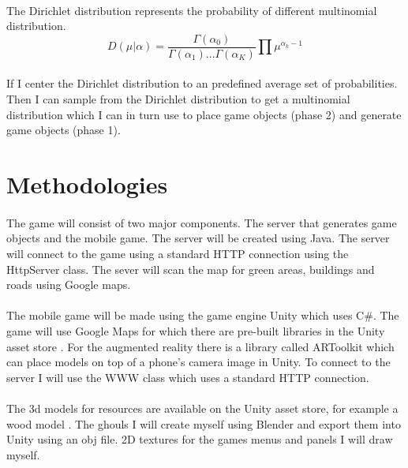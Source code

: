 \documentclass{article}
\begin{document}
		\paragraph{}The Dirichlet distribution represents the probability of different multinomial distribution.
		\begin{equation}
			D(\mu|\alpha ) = \frac{\Gamma(\alpha_0)}{\Gamma(\alpha_1)...\Gamma(\alpha_K)}\prod\mu^{\alpha_k-1}
		\end{equation}
		\paragraph{}If I center the Dirichlet distribution to an predefined average set of probabilities. Then I can sample from the Dirichlet distribution to get a multinomial distribution which I can in turn use to place game objects (phase 2) and generate game objects (phase 1). \cite{Dirichlet2010}
		
		\section{Methodologies}
		\paragraph{}The game will consist of two major components. The server that generates game objects and the mobile game. The server will be created using Java. The server will connect to the game using a standard HTTP connection using the HttpServer class. \cite{HTTPServer} The sever will scan the map for green areas, buildings and roads using Google maps.\cite{ARToolKit} 
		
		\paragraph{}The mobile game will be made using the game engine Unity which uses C\#. The game will use Google Maps for which there are pre-built libraries in the Unity asset store \cite{GMUnity}. For the augmented reality there is a library called ARToolkit \cite{ARToolKit} which can place models on top of a phone's camera image in Unity. To connect to the server I will use the WWW \cite{WWW} class which uses a standard HTTP connection. 
		
		\paragraph{}The 3d models for resources are available on the Unity asset store, for example a wood model \cite{TreeUnity}. The ghouls I will create myself using Blender \cite{Blender} and export them into Unity using an obj file. 2D textures for the games menus and panels I will draw myself. 
		
\end{document}
